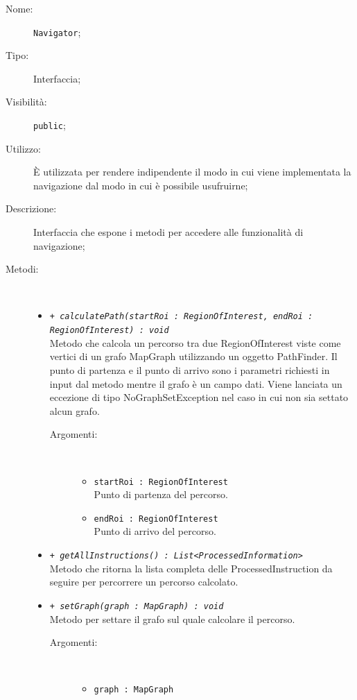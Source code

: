 \documentclass[../DefinizioneDiProdotto.tex]{subfiles}
\begin{document}
    \begin{description}
\item[Nome:] \texttt{Navigator};
\item[Tipo:] Interfaccia;
\item[Visibilità:] \texttt{public};
\item[Utilizzo:] È utilizzata per rendere indipendente il modo in cui viene implementata la navigazione dal modo in cui è possibile usufruirne;
\item[Descrizione:] Interfaccia che espone i metodi per accedere alle funzionalità di navigazione;
\item[Metodi:] \
\begin{itemize}
\item \texttt{+ \textit{calculatePath(startRoi : RegionOfInterest, endRoi :\\RegionOfInterest) : void}}\\
Metodo che calcola un percorso tra due RegionOfInterest viste come vertici di un grafo MapGraph utilizzando un oggetto PathFinder. Il punto di partenza e il punto di arrivo sono i parametri richiesti in input dal metodo mentre il grafo è un campo dati. Viene lanciata un eccezione di tipo NoGraphSetException nel caso in cui non sia settato alcun grafo.
 \begin{description}
\item[Argomenti:] \
\begin{itemize}
\item \texttt{startRoi : RegionOfInterest}\\
Punto di partenza del percorso.\item \texttt{endRoi : RegionOfInterest}\\
Punto di arrivo del percorso.\end{itemize}
\end{description}
\item \texttt{+ \textit{getAllInstructions() : List<ProcessedInformation>}}\\
Metodo che ritorna la lista completa delle ProcessedInstruction da seguire per percorrere un percorso calcolato.
 \item \texttt{+ \textit{setGraph(graph : MapGraph) : void}}\\
Metodo per settare il grafo sul quale calcolare il percorso.
 \begin{description}
\item[Argomenti:] \
\begin{itemize}
\item \texttt{graph : MapGraph}\\

\end{itemize}
\end{description}
\end{itemize}
\end{description}
\end{document}
